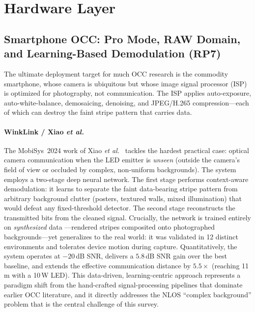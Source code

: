 \documentclass[10pt,a4paper]{article}
\newcommand{\rp}[1]{\textbf{RP#1}}
\begin{document}
\section{Hardware Layer}
\label{sec:hardware}

\subsection{Smartphone OCC: Pro Mode, RAW Domain, and Learning-Based Demodulation ($\rp{7}$)}
\label{sec:rp7}

The ultimate deployment target for much OCC research is the commodity
smartphone, whose camera is ubiquitous but whose image signal processor
(ISP) is optimized for photography, not communication. The ISP applies
auto-exposure, auto-white-balance, demosaicing, denoising, and
JPEG/H.265 compression---each of which can destroy the faint stripe
pattern that carries data.

\paragraph{WinkLink / Xiao \emph{et al.}}
The MobiSys~2024 work of Xiao \emph{et al.}~\cite{winklink2024} tackles
the hardest practical case: optical camera communication when the LED
emitter is \emph{unseen} (outside the camera's field of view or occluded
by complex, non-uniform backgrounds). The system employs a two-stage
deep neural network. The first stage performs context-aware
demodulation: it learns to separate the faint data-bearing stripe
pattern from arbitrary background clutter (posters, textured walls,
mixed illumination) that would defeat any fixed-threshold detector. The
second stage reconstructs the transmitted bits from the cleaned signal.
Crucially, the network is trained entirely on \emph{synthesized} data
---rendered stripes composited onto photographed backgrounds---yet
generalizes to the real world: it was validated in 12 distinct
environments and tolerates device motion during capture. Quantitatively,
the system operates at $-20$\,dB SNR, delivers a $5.8$\,dB SNR gain over
the best baseline, and extends the effective communication distance by
$5.5\times$ (reaching 11\,m with a 10\,W LED). This data-driven,
learning-centric approach represents a paradigm shift from the
hand-crafted signal-processing pipelines that dominate earlier OCC
literature, and it directly addresses the NLOS ``complex background''
problem that is the central challenge of this survey.
\end{document}

